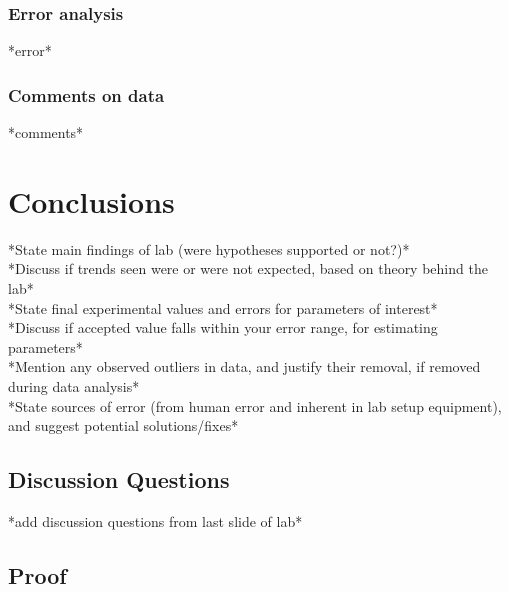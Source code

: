 \documentclass[
	letterpaper, %
	10pt, %
]{labby boi}
\begin{document}
\subsubsection{Error analysis}
*error*

\subsubsection{Comments on data}
*comments*

\section{Conclusions}
*State main findings of lab (were hypotheses supported or not?)*\\
*Discuss if trends seen were or were not expected, based on theory behind the lab*\\
*State final experimental values and errors for parameters of interest*\\
*Discuss if accepted value falls within your error range, for estimating parameters*\\
*Mention any observed outliers in data, and justify their removal, if removed during data
analysis*\\
*State sources of error (from human error and inherent in lab setup equipment), and
suggest potential solutions/fixes*

\subsection{Discussion Questions}
*add discussion questions from last slide of lab*

\subsection{Proof}


\end{document}
